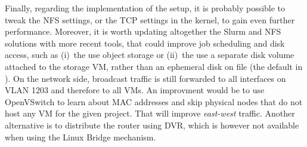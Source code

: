 %
Finally, regarding the implementation of the setup,
%
it is probably possible to tweak the NFS settings, or the TCP settings
in the kernel, to gain even further performance.
%
Moreover, it is worth updating altogether the Slurm and NFS solutions
with more recent tools, that could improve job scheduling and disk
access, such as (i)~the use object storage or (ii)~the use a separate
disk volume attached to the storage VM, rather than an ephemeral disk
on file (\ie the default in ).
%
On the network side, broadcast traffic is still forwarded to all
interfaces on VLAN 1203 and therefore to all VMs. An improvment would
be to use OpenVSwitch to learn about MAC addresses and skip physical
nodes that do not host any VM for the given project. That will improve
\emph{east-west} traffic. Another alternative is to distribute the
router using DVR, which is however not available when using the Linux
Bridge mechanism.


